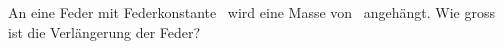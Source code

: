 An eine Feder mit Federkonstante \DfO\ wird eine Masse von \mFeO\ angehängt. Wie gross ist die Verlängerung der Feder?
